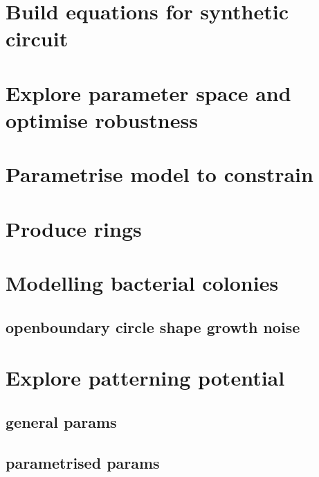 

\section{Build equations for synthetic circuit}
\section{Explore parameter space and optimise robustness}
\section{Parametrise model to constrain}

\section{Produce rings}
\section{Modelling bacterial colonies}
\subsection{openboundary circle shape growth noise}
\section{Explore patterning potential}
\subsection{general params}
\subsection{parametrised params}
